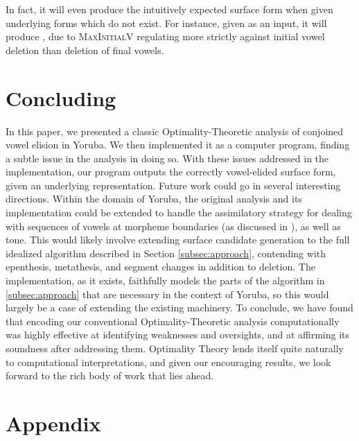 \documentclass[12pt]{article}
\newcommand{\maxplusv}{\textsc{MaxInitialV}}
\begin{document}
In fact, it will even produce the intuitively expected surface form when given
underlying forms which do not exist. For instance, given \textipa{[so-el\'u]}
as an input, it will produce , due to \maxplusv{} regulating
more strictly against initial vowel deletion than deletion of final vowels.

\section{Concluding}

In this paper, we presented a classic Optimality-Theoretic analysis of
conjoined vowel elision in Yoruba. We then implemented it as a computer
program, finding a subtle issue in the analysis in doing so. With these issues
addressed in
the implementation, our program outputs the correctly vowel-elided surface
form, given an underlying representation. Future work could go in several
interesting directions. Within the domain of Yoruba, the original analysis and
its implementation could be extended to handle the assimilatory strategy for
dealing with sequences of vowels at morpheme boundaries (as discussed in
\cite{ola2002yoruba}), as well as tone. This would likely involve extending
surface candidate generation to the full idealized algorithm described in
Section \ref{subsec:approach}, contending with epenthesis, metathesis, and
segment changes in addition to deletion. The implementation, as it exists,
faithfully models the parts of the algorithm in \ref{subsec:approach} that are
necessary in the context of Yoruba, so this would largely be a case of
extending the existing machinery. To conclude, we have found that encoding our
conventional Optimality-Theoretic analysis computationally was highly effective
at identifying weaknesses and oversights, and at affirming its soundness after
addressing them. Optimality Theory lends itself quite naturally to computational
interpretations, and given our encouraging results, we look forward to the rich
body of work that lies ahead.

\pagebreak

\section{Appendix}
\end{document}
